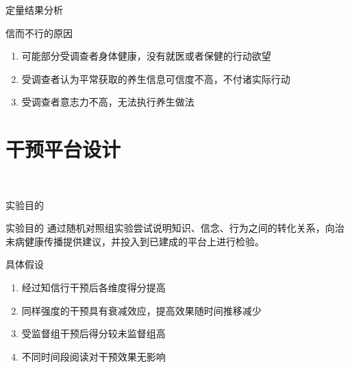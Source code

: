 \begin{frame}[allowframebreaks]{定量结果分析}
\begin{exampleblock}{信而不行的原因}
    \begin{enumerate}
        \item 可能部分受调查者身体健康，没有就医或者保健的行动欲望
        \item 受调查者认为平常获取的养生信息可信度不高，不付诸实际行动
        \item 受调查者意志力不高，无法执行养生做法
    \end{enumerate}
\end{exampleblock}
\end{frame}
\section{干预平台设计}
\begin{frame}[plain, b]

\centering
\huge \textcolor{white}{进一步实验}
\normalsize

\vspace*{\fill}


\end{frame}

\begin{frame}{实验目的}
\begin{exampleblock}{实验目的}
    通过随机对照组实验尝试说明知识、信念、行为之间的转化关系，向治未病健康传播提供建议，并投入到已建成的平台上进行检验。
\end{exampleblock}
\begin{alertblock}{具体假设}
    
    \begin{enumerate}
        \item 经过知信行干预后各维度得分提高
        \item 同样强度的干预具有衰减效应，提高效果随时间推移减少
        \item 受监督组干预后得分较未监督组高
        \item 不同时间段阅读对干预效果无影响
    \end{enumerate}
\end{alertblock}

\end{frame}

